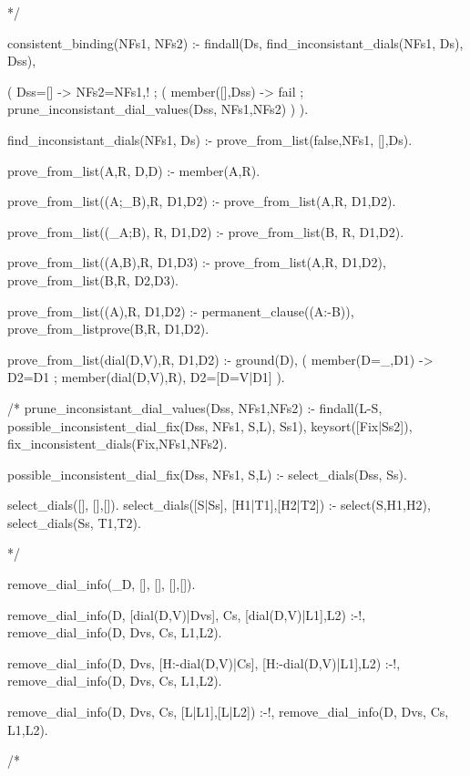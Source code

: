 \documentclass{book}[9pt]
\newenvironment{code}%
{\small \verbatim}%
{\endverbatim \large}
\begin{document}
\begin{code}
*/

consistent_binding(NFs1, NFs2) :-
	findall(Ds, find_inconsistant_dials(NFs1, Ds), Dss),

	( Dss=[]
        -> NFs2=NFs1,!
        ;   %
	    ( member([],Dss) 
	    -> fail
	    ;  %
	       prune_inconsistant_dial_values(Dss, NFs1,NFs2)
	    )
        ).

find_inconsistant_dials(NFs1, Ds) :-
	prove_from_list(false,NFs1, [],Ds).

prove_from_list(A,R, D,D) :- member(A,R).

prove_from_list((A;_B),R, D1,D2) :-
        prove_from_list(A,R, D1,D2).

prove_from_list((_A;B), R, D1,D2) :-
        prove_from_list(B, R,  D1,D2).

prove_from_list((A,B),R, D1,D3) :-
        prove_from_list(A,R, D1,D2),
        prove_from_list(B,R, D2,D3).

prove_from_list((A),R, D1,D2) :-
        permanent_clause((A:-B)),
        prove_from_listprove(B,R, D1,D2).

prove_from_list(dial(D,V),R, D1,D2) :-
        ground(D),
        ( member(D=_,D1) ->
            D2=D1
        ;
            member(dial(D,V),R),
            D2=[D=V|D1]
        ).

/*
prune_inconsistant_dial_values(Dss, NFs1,NFs2) :-
	findall(L-S, possible_inconsistent_dial_fix(Dss, NFs1, S,L), Ss1),
	keysort([Fix|Ss2]), 
	fix_inconsistent_dials(Fix,NFs1,NFs2).

possible_inconsistent_dial_fix(Dss, NFs1, S,L) :-
	select_dials(Dss, Ss).

select_dials([], [],[]).
select_dials([S|Ss], [H1|T1],[H2|T2]) :-
	select(S,H1,H2),
	select_dials(Ss, T1,T2).

\end{code}


\begin{code}
*/

remove_dial_info(_D, [], [], [],[]).

remove_dial_info(D, [dial(D,V)|Dvs], Cs, [dial(D,V)|L1],L2) :-!,
        remove_dial_info(D, Dvs, Cs, L1,L2).
    
remove_dial_info(D, Dvs, [H:-dial(D,V)|Cs], [H:-dial(D,V)|L1],L2) :-!,
        remove_dial_info(D, Dvs, Cs, L1,L2).

remove_dial_info(D, Dvs, Cs, [L|L1],[L|L2]) :-!,
        remove_dial_info(D, Dvs, Cs, L1,L2).

/*
\end{code}
\end{document}

